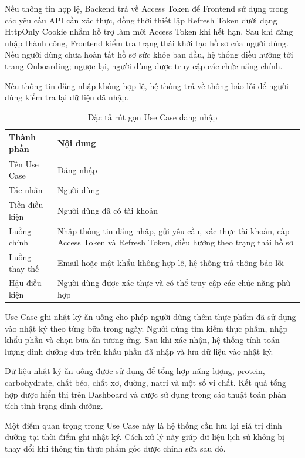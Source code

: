 Nếu thông tin hợp lệ, Backend trả về Access Token để Frontend sử dụng trong các yêu cầu API cần xác thực, đồng thời thiết lập Refresh Token dưới dạng HttpOnly Cookie nhằm hỗ trợ làm mới Access Token khi hết hạn. Sau khi đăng nhập thành công, Frontend kiểm tra trạng thái khởi tạo hồ sơ của người dùng. Nếu người dùng chưa hoàn tất hồ sơ sức khỏe ban đầu, hệ thống điều hướng tới trang Onboarding; ngược lại, người dùng được truy cập các chức năng chính.

Nếu thông tin đăng nhập không hợp lệ, hệ thống trả về thông báo lỗi để người dùng kiểm tra lại dữ liệu đã nhập.

\begin{table}[H]
\centering
\caption{Đặc tả rút gọn Use Case đăng nhập}
\begin{tabular}{|p{4cm}|p{11cm}|}
\hline
\textbf{Thành phần} & \textbf{Nội dung} \\ \hline
Tên Use Case & Đăng nhập \\ \hline
Tác nhân & Người dùng \\ \hline
Tiền điều kiện & Người dùng đã có tài khoản \\ \hline
Luồng chính & Nhập thông tin đăng nhập, gửi yêu cầu, xác thực tài khoản, cấp Access Token và Refresh Token, điều hướng theo trạng thái hồ sơ \\ \hline
Luồng thay thế & Email hoặc mật khẩu không hợp lệ, hệ thống trả thông báo lỗi \\ \hline
Hậu điều kiện & Người dùng được xác thực và có thể truy cập các chức năng phù hợp \\ \hline
\end{tabular}
\end{table}

Use Case ghi nhật ký ăn uống cho phép người dùng thêm thực phẩm đã sử dụng vào nhật ký theo từng bữa trong ngày. Người dùng tìm kiếm thực phẩm, nhập khẩu phần và chọn bữa ăn tương ứng. Sau khi xác nhận, hệ thống tính toán lượng dinh dưỡng dựa trên khẩu phần đã nhập và lưu dữ liệu vào nhật ký.

Dữ liệu nhật ký ăn uống được sử dụng để tổng hợp năng lượng, protein, carbohydrate, chất béo, chất xơ, đường, natri và một số vi chất. Kết quả tổng hợp được hiển thị trên Dashboard và được sử dụng trong các thuật toán phân tích tình trạng dinh dưỡng.

Một điểm quan trọng trong Use Case này là hệ thống cần lưu lại giá trị dinh dưỡng tại thời điểm ghi nhật ký. Cách xử lý này giúp dữ liệu lịch sử không bị thay đổi khi thông tin thực phẩm gốc được chỉnh sửa sau đó.

